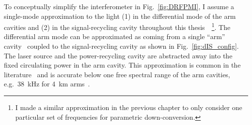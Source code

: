 
To conceptually simplify the interferometer in Fig.~\ref{fig:DRFPMI}, I assume a single-mode approximation to the light (1) in the differential mode of the arm cavities and (2) in the signal-recycling cavity throughout this thesis~\cite{}~\footnote{I made a similar approximation in the previous chapter to only consider one particular set of frequencies for parametric down-conversion.}. %
The differential arm mode can be approximated as coming from a single ``arm'' cavity~\cite{} coupled to the signal-recycling cavity as shown in Fig.~\ref{fig:dIS_config}.
The laser source and the power-recycling cavity are abstracted away into the fixed circulating power in the arm cavity.
This approximation is common in the literature~\cite{korobkoQuantumExpanderGravitationalwave2019,adyaQuantumEnhancedKHz2020,liBroadbandSensitivityImprovement2020,miaoEnhancingBandwidthGravitationalWave2015,} and is accurate below one free spectral range of the arm cavities, e.g.\ 38~kHz for 4~km arms~\cite{miaoEnhancingBandwidthGravitationalWave2015,}.



